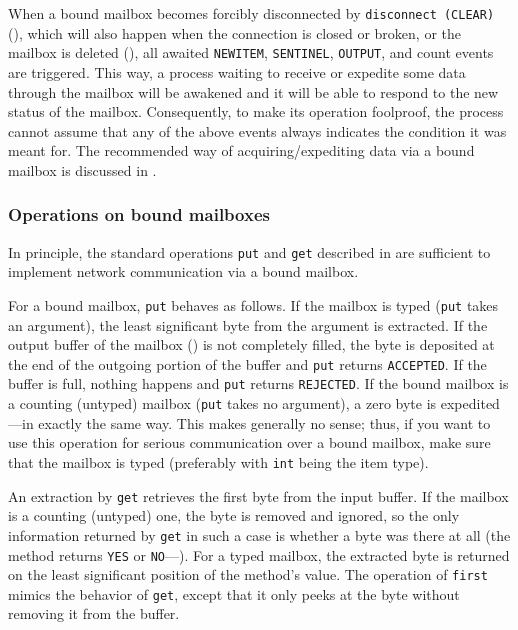 When a bound mailbox becomes forcibly disconnected
by {\tt disconnect~(CLEAR)} (), which will also happen
when the connection is closed or broken, or the mailbox is deleted
(),
all awaited {\tt NEWITEM}, {\tt SENTINEL}, {\tt OUTPUT}, and count
events are triggered.
This way, a process waiting to receive or expedite some data through
the mailbox will be awakened and it will be able to respond to the
new status of the mailbox.
Consequently, to make its operation foolproof, the process
cannot assume that any of the above events always indicates the condition
it was meant for.
The recommended way of acquiring/expediting data via a bound mailbox
is discussed in .

\subsubsection{Operations on bound mailboxes}
\label{rm_mb_bo_rw}

In principle, the standard operations {\tt put} and {\tt get}
described in  are sufficient to implement network
communication via a bound mailbox.

For a bound mailbox, {\tt put} behaves as follows.
If the mailbox is typed ({\tt put} takes an argument),
the least significant byte from the argument is extracted.
If the output buffer of the mailbox () is not completely
filled, the byte is deposited at the end of the outgoing portion
of the buffer and {\tt put} returns {\tt ACCEPTED}.
If the buffer is full, nothing happens and {\tt put} returns
{\tt REJECTED}.
If the bound mailbox is a counting (untyped) mailbox ({\tt put} takes
no argument), a zero byte is expedited---in exactly the same way.
This makes generally no sense; thus, if you want to use this operation
for serious communication over a bound mailbox, make sure that the mailbox
is typed (preferably with {\tt int} being the item type).

An extraction by {\tt get} retrieves the first byte from the input buffer.
If the mailbox is a counting (untyped) one, the byte is removed and
ignored, so the only information returned by {\tt get} in such a case
is whether a byte was there at all (the method returns {\tt YES} or
{\tt NO}---).
For a typed mailbox, the extracted byte is returned on the least significant
position of the method's value.
The operation of {\tt first} mimics the behavior of {\tt get}, except that
it only peeks at the byte without removing it from the buffer.

